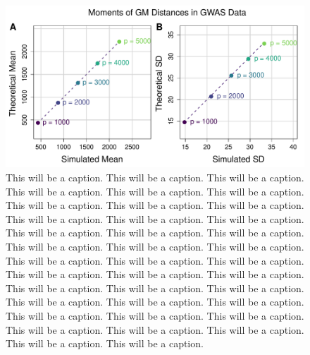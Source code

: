 \documentclass[10pt,letterpaper]{article}\usepackage[]{graphicx}\usepackage[]{color}
\begin{document}
\begin{figure}[H]
	\includegraphics[width=\textwidth]{compared_moments_gwas_gm.pdf}
	\caption{This will be a caption. This will be a caption. This will be a caption. This will be a caption. This will be a caption. This will be a caption. This will be a caption. This will be a caption. This will be a caption. This will be a caption. This will be a caption. This will be a caption. This will be a caption. This will be a caption. This will be a caption. This will be a caption. This will be a caption. This will be a caption. This will be a caption. This will be a caption. This will be a caption. This will be a caption. This will be a caption. This will be a caption. This will be a caption. This will be a caption. This will be a caption. This will be a caption. This will be a caption. This will be a caption. This will be a caption. This will be a caption. This will be a caption. This will be a caption. This will be a caption. This will be a caption. This will be a caption. This will be a caption.}
\end{figure}
\end{document}

